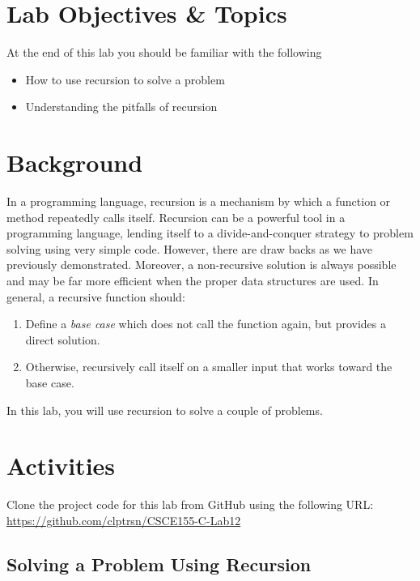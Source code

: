 \documentclass[12pt]{scrartcl}
\begin{document}
\section{Lab Objectives \& Topics}
At the end of this lab you should be familiar with the following
\begin{itemize}
  \item How to use recursion to solve a problem
  \item Understanding the pitfalls of recursion
\end{itemize}

\section{Background}

In a programming language, recursion is a mechanism by which 
a function or method repeatedly calls itself.  Recursion can be a 
powerful tool in a programming language, lending itself to a 
divide-and-conquer strategy to problem solving using very simple 
code.  However, there are draw backs as we have previously 
demonstrated.  Moreover, a non-recursive solution is always 
possible and may be far more efficient when the proper data 
structures are used.  In general, a recursive function should:
\begin{enumerate}
  \item Define a \emph{base case} which does not call the 
	function again, but provides a direct solution.
  \item Otherwise, recursively call itself on a smaller input that 
	works toward the base case. 
\end{enumerate}
	
In this lab, you will use recursion to solve a couple of problems.

\section{Activities}

Clone the project code for this lab from GitHub using the following 
URL: \url{https://github.com/clptrsn/CSCE155-C-Lab12}

\subsection{Solving a Problem Using Recursion}
\end{document}
